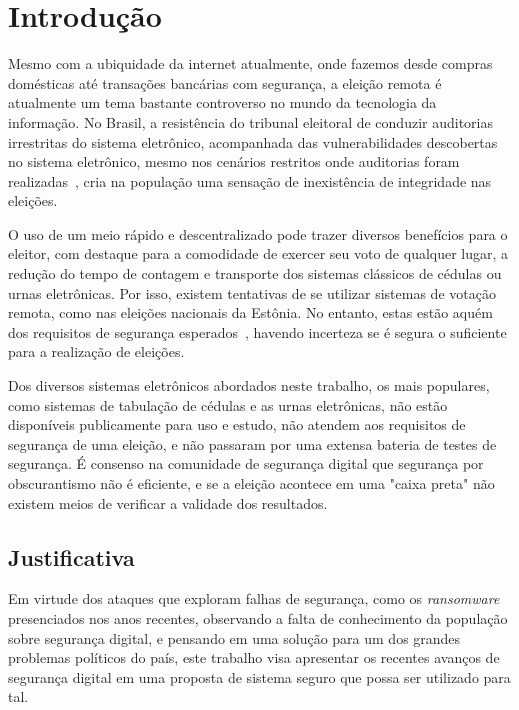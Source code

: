 

\chapter{Introdução}

Mesmo com a ubiquidade da internet atualmente, onde fazemos desde compras
domésticas até transações bancárias com segurança, a eleição remota é
atualmente um tema bastante controverso no mundo da tecnologia da informação.
No Brasil, a resistência do tribunal eleitoral de conduzir auditorias
irrestritas do sistema eletrônico, acompanhada das vulnerabilidades descobertas
no sistema eletrônico, mesmo nos cenários restritos onde auditorias foram
realizadas~\cite{aranha2012vulnerabilidades}, cria na população uma sensação de
inexistência de integridade nas eleições.

O uso de um meio rápido e descentralizado pode trazer diversos benefícios para
o eleitor, com destaque para a comodidade de exercer seu voto de qualquer
lugar, a redução do tempo de contagem e transporte dos sistemas clássicos de
cédulas ou urnas eletrônicas. Por isso, existem tentativas de se utilizar
sistemas de votação remota, como nas eleições nacionais da Estônia. No entanto,
estas estão aquém dos requisitos de segurança
esperados~\cite{Springall:2014:SAE:2660267.2660315}, havendo incerteza se é
segura o suficiente para a realização de eleições.

Dos diversos sistemas eletrônicos abordados neste trabalho, os mais populares,
como sistemas de tabulação de cédulas e as urnas eletrônicas, não estão
disponíveis publicamente para uso e estudo, não atendem aos requisitos de
segurança de uma eleição, e não passaram por uma extensa bateria de testes de
segurança. É consenso na comunidade de segurança digital que segurança por
obscurantismo não é eficiente, e se a eleição acontece em uma "caixa preta" não
existem meios de verificar a validade dos resultados.

\section{Justificativa}

Em virtude dos ataques que exploram falhas de segurança, como os
\textit{ransomware} presenciados nos anos recentes, observando a falta de
conhecimento da população sobre segurança digital, e pensando em uma solução
para um dos grandes problemas políticos do país, este trabalho visa apresentar
os recentes avanços de segurança digital em uma proposta de sistema seguro que
possa ser utilizado para tal.

